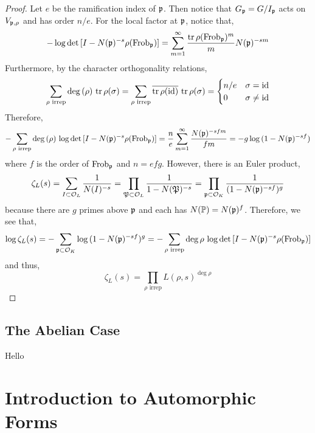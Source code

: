 \documentclass[12pt]{article}
\begin{document}
\begin{proof}
Let $e$ be the ramification index of $\mathfrak{p}$. Then notice that $G_{\mathfrak{p}} = G / I_{\mathfrak{p}}$ acts on $V_{\mathfrak{p}, \rho}$ and has order $n / e$. For the local factor at $\mathfrak{p}$, notice that,
\[ - \log{\det{[I - N(\mathfrak{p})^{-s} \rho(\mathrm{Frob}_{\mathfrak{p}})]}} = \sum_{m = 1}^\infty \frac{\operatorname{\mathrm{tr}}{\rho(\mathrm{Frob}_{\mathfrak{p}})^m}}{m} N(\mathfrak{p})^{-sm} \]
Furthermore, by the character orthogonality relations,
\[ \sum_{\rho \text{ irrep}} \deg{(\rho)} \, \operatorname{\mathrm{tr}}{\rho(\sigma)} = \sum_{\rho \text{ irrep}} \overline{\operatorname{\mathrm{tr}}{\rho(\mathrm{id})}} \, \operatorname{\mathrm{tr}}{\rho(\sigma)} = 
\begin{cases}
n/e & \sigma = \mathrm{id}
\\
0 & \sigma \neq \mathrm{id}
\end{cases} \]
Therefore,
\[ - \sum_{\rho \text{ irrep}} \deg{(\rho)} \, \log{\det{[I - N(\mathfrak{p})^{-s} \rho(\mathrm{Frob}_{\mathfrak{p}})]}} = \frac{n}{e} \sum_{m = 1}^\infty \frac{N(\mathfrak{p})^{-sfm}}{fm} = - g \log{(1 - N(\mathfrak{p})^{-sf})} \]
where $f$ is the order of $\mathrm{Frob}_{\mathfrak{p}}$ and $n = efg$. However, there is an Euler product,
\[ \zeta_L(s) = \sum_{I \subset \mathcal{O}_{L}} \frac{1}{N(I)^{-s}} = \prod_{\mathfrak{P} \subset \mathcal{O}_{L}} \frac{1}{1 - N(\mathfrak{P})^{-s}} = \prod_{\mathfrak{p} \subset \mathcal{O}_{K}} \frac{1}{(1 - N(\mathfrak{p})^{-sf})^{g}} \]
because there are $g$ primes above $\mathfrak{p}$ and each has $N(\mathbb{P}) = N(\mathfrak{p})^f$. Therefore, we see that,
\[ \log{\zeta_L(s)} = - \sum_{\mathfrak{p} \subset \mathcal{O}_{K}} \log{(1 - N(\mathfrak{p})^{-sf})^g} = - \sum_{\rho \text{ irrep}} \deg{\rho} \, \log{\det{[I - N(\mathfrak{p})^{-s} \rho(\mathrm{Frob}_{\mathfrak{p}})]}} \]
and thus,
\[ \zeta_L(s) = \prod_{\rho \text{ irrep}} L(\rho, s)^{\deg{\rho}} \]
\end{proof}

\subsection{The Abelian Case}

Hello

\section{Introduction to Automorphic Forms}
\end{document}
